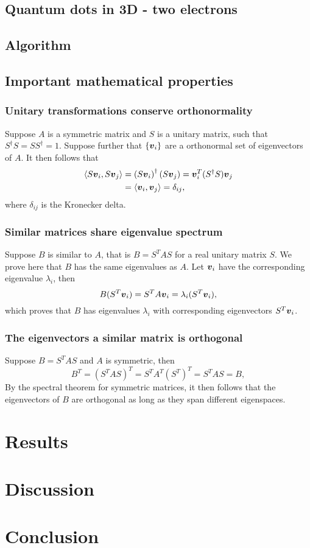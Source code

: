 \documentclass[english,notitlepage,reprint]{revtex4-1}  %
\begin{document}
\subsection*{Quantum dots in 3D - two electrons}


 

\subsection{Algorithm}
\subsection{Important mathematical properties}
\subsubsection{Unitary transformations conserve orthonormality}
Suppose $A$ is a symmetric matrix and $S$ is a unitary matrix, such that $S^\dagger S = S S^\dagger = 1$. Suppose further that $\{\vb*{v}_i\}$ are a orthonormal set of eigenvectors of $A$. It then follows that 
\begin{equation}
\begin{split}
\langle S\vb*{v}_i, S\vb*{v}_j \rangle & = \left(S \vb*{v}_i\right)^\dagger (S\vb*{v}_j) = \vb*{v}_i^T (S^\dagger S) \vb*{v}_j \\
& = \langle \vb*{v}_i, \vb*{v}_j \rangle = \delta_{ij},
\end{split}
\end{equation}
where $\delta_{ij}$ is the Kronecker delta.

\subsubsection{Similar matrices share eigenvalue spectrum}
Suppose $B$ is similar to $A$, that is $B = S^TAS$ for a real unitary matrix $S$. We prove here that $B$ has the same eigenvalues as $A$. Let $\vb*{v}_i$ have the corresponding eigenvalue $\lambda_i$, then
\begin{equation}
	B(S^T\vb*{v}_i) = S^TA \vb*{v}_i = \lambda_i (S^T\vb*{v}_i),
\end{equation}
which proves that $B$ has eigenvalues $\lambda_i$ with corresponding eigenvectors $S^T\vb*{v}_i$.

\subsubsection{The eigenvectors a similar matrix is orthogonal}
Suppose $B = S^TA S$ and $A$ is symmetric, then
\begin{equation}
	B^T = \left(S^T A S\right)^T = S^T A^T (S^T)^T = S^T A S = B,
\end{equation}
By the spectral theorem for symmetric matrices, it then follows that the eigenvectors of $B$ are orthogonal as long as they span different eigenspaces.
\section{Results}
\section{Discussion}
\section{Conclusion}
\end{document}
